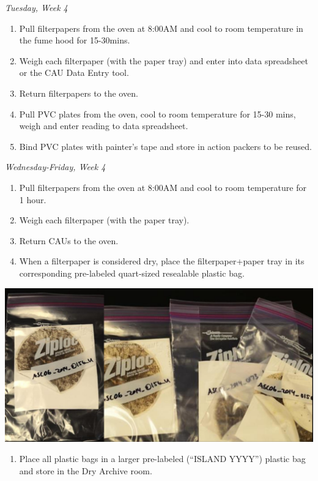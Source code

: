 \documentclass[
]{book}
\providecommand{\tightlist}{%
  \setlength{\itemsep}{0pt}\setlength{\parskip}{0pt}}
\begin{document}
\emph{Tuesday, Week 4}

\begin{enumerate}
\def\labelenumi{\arabic{enumi}.}
\tightlist
\item
  Pull filterpapers from the oven at 8:00AM and cool to room temperature in the fume hood for 15-30mins.
\item
  Weigh each filterpaper (with the paper tray) and enter into data spreadsheet or the CAU Data Entry tool.
\item
  Return filterpapers to the oven.
\item
  Pull PVC plates from the oven, cool to room temperature for 15-30 mins, weigh and enter reading to data spreadsheet.
\item
  Bind PVC plates with painter's tape and store in action packers to be reused.
\end{enumerate}

\emph{Wednesday-Friday, Week 4}

\begin{enumerate}
\def\labelenumi{\arabic{enumi}.}
\tightlist
\item
  Pull filterpapers from the oven at 8:00AM and cool to room temperature for 1 hour.
\item
  Weigh each filterpaper (with the paper tray).
\item
  Return CAUs to the oven.
\item
  When a filterpaper is considered dry, place the filterpaper+paper tray in its corresponding pre-labeled quart-sized resealable plastic bag.
\end{enumerate}

\includegraphics{images/DailyTasks15.jpg}

\begin{enumerate}
\def\labelenumi{\arabic{enumi}.}
\setcounter{enumi}{4}
\tightlist
\item
  Place all plastic bags in a larger pre-labeled (``ISLAND YYYY'') plastic bag and store in the Dry Archive room.
\end{enumerate}
\end{document}
